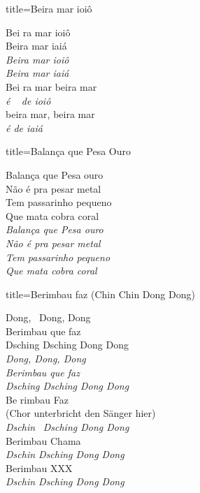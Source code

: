 \documentclass[fontsize=14pt, paper=a4, twoside, DIV=20]{scrreprt} %
\begin{document}
\begin{multicols*}{2}
\begin{song}{title={Beira mar ioiô}}
    \begin{verse*}
        Bei ra mar ioiô\\
        Beira mar iaiá\\
        \textit{Beira mar ioiô}\\
        \textit{Beira mar iaiá}\\

        Bei ra mar beira mar\\
        \textit{é} \ \textit{ de ioiô}\\
        beira mar, beira mar\\
        \textit{é de iaiá}\\
    \end{verse*}
\end{song}

\begin{song}{title={Balança que Pesa Ouro}}
        \begin{verse*}
        Balança que Pesa ouro \\ 
        Não é pra pesar metal \\ 
        Tem passarinho pequeno \\ 
        Que mata cobra coral \\
                
        \textit{Balança que Pesa ouro \\ 
        Não é pra pesar metal \\ 
        Tem passarinho pequeno \\ 
        Que mata cobra coral} \\
        \end{verse*}
\end{song}

\columnbreak
\begin{song}{title={Berimbau faz (Chin Chin Dong Dong)}}
        \begin{verse*}
            Dong, \ Dong, Dong\\
            Berimbau que faz\\
            Dsching Dsching Dong Dong\\
            \textit{Dong, Dong, Dong\\
            Berimbau que faz\\
            Dsching Dsching Dong Dong}\\
            Be rimbau Faz \\
            (Chor unterbricht den Sänger hier)\\
            \textit{Dschin} \ \textit{Dsching Dong Dong}\\
            Berimbau Chama\\
            \textit{Dschin Dsching Dong Dong}\\
            Berimbau XXX\\
            \textit{Dschin Dsching Dong Dong}\\
        \end{verse*}
\end{song}


\end{multicols*}
\end{document}
